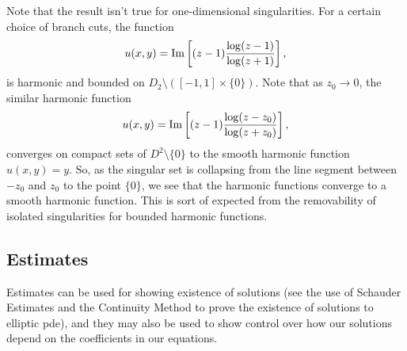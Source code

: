 Note that the result isn't true for one-dimensional singularities. For a certain choice of branch cuts, the function
\begin{equation}
u(x,y) = \text{Im} \left[(z-1) \frac{\log(z-1)}{\log(z+1)}\right],
\end{equation}
is harmonic and bounded on $D_2 \setminus([-1,1]\times\{0\}).$ Note that as $z_0\to 0$, the similar harmonic function
\begin{equation}
u(x,y) =  \text{Im} \left[(z-1) \frac{\log(z-z_0)}{\log(z+z_0)}\right],
\end{equation}
converges on compact sets of $D^2\setminus \{0\}$ to the smooth harmonic function $u(x,y) = y$. So, as the singular set is collapsing from the line segment between $-z_0$ and $z_0$ to the point $\{0\}$, we see that the harmonic functions converge to a smooth harmonic function. This is sort of expected from the removability of isolated singularities for bounded harmonic functions.

\subsection{Estimates}

Estimates can be used for showing existence of solutions (see the use of Schauder Estimates and the Continuity Method to prove the existence of solutions to elliptic pde), and they may also be used to show control over how our solutions depend on the coefficients in our equations.

